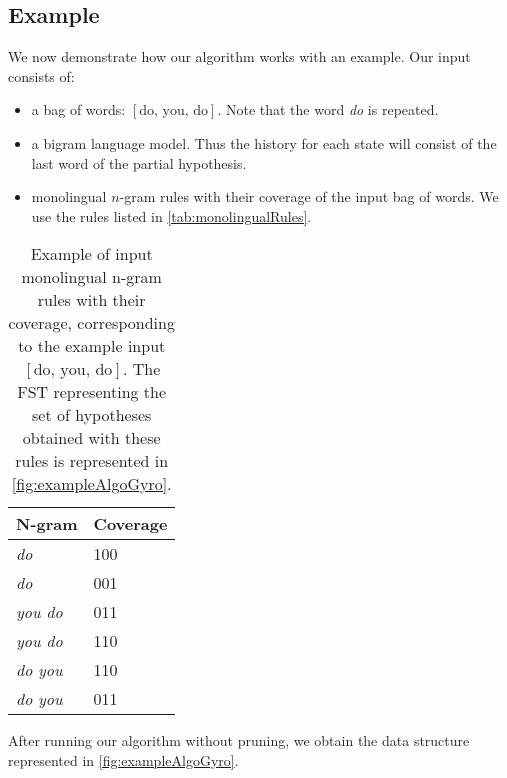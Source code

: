 \subsection{Example}

We now demonstrate how our algorithm works with an example.
Our input consists of:
%
\begin{itemize}
  \item a bag of words: $[\text{do, you, do}]$. Note that the word \emph{do} is repeated.
  \item a bigram language model. Thus the history for each state will consist of the
    last word of the partial hypothesis.
  \item monolingual $n$-gram rules with their coverage of the input bag of words. We
    use the rules listed in \autoref{tab:monolingualRules}.
\end{itemize}
%
\begin{table}
  \begin{center}
  \begin{tabular}{l|l}
    N-gram & Coverage \\
    \hline
    \emph{do} & 100 \\
    \emph{do} & 001 \\
    \emph{you do} & 011 \\
    \emph{you do} & 110 \\
    \emph{do you} & 110 \\
    \emph{do you} & 011 \\
  \end{tabular}
  \caption{Example of input monolingual n-gram rules with their coverage, corresponding
    to the example input $[\text{do, you, do}]$. The FST representing the set of hypotheses
    obtained with these rules is represented in \autoref{fig:exampleAlgoGyro}.}
  \label{tab:monolingualRules}
  \end{center}
\end{table}
%
After running our algorithm without pruning, we obtain the data structure
represented in \autoref{fig:exampleAlgoGyro}.
%
